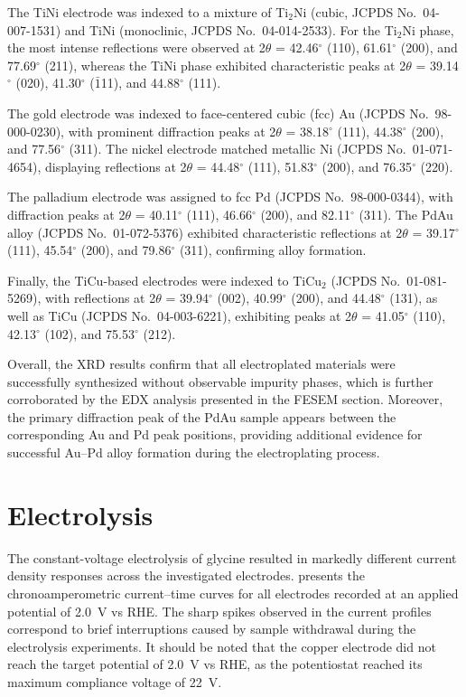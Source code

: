 \documentclass[journal=jacsat,manuscript=article,email=false]{achemso}
\begin{document}
The TiNi electrode was indexed to a mixture of Ti$_2$Ni (cubic, JCPDS No.~04-007-1531) and TiNi (monoclinic, JCPDS No.~04-014-2533). For the Ti$_2$Ni phase, the most intense reflections were observed at 2$\theta$ = 42.46$^\circ$ (110), 61.61$^\circ$ (200), and 77.69$^\circ$ (211), whereas the TiNi phase exhibited characteristic peaks at 2$\theta$ = 39.14$^\circ$ (020), 41.30$^\circ$ ($\bar{1}$11), and 44.88$^\circ$ (111).

The gold electrode was indexed to face-centered cubic (fcc) Au (JCPDS No.~98-000-0230), with prominent diffraction peaks at 2$\theta$ = 38.18$^\circ$ (111), 44.38$^\circ$ (200), and 77.56$^\circ$ (311). The nickel electrode matched metallic Ni (JCPDS No.~01-071-4654), displaying reflections at 2$\theta$ = 44.48$^\circ$ (111), 51.83$^\circ$ (200), and 76.35$^\circ$ (220).

The palladium electrode was assigned to fcc Pd (JCPDS No.~98-000-0344), with diffraction peaks at 2$\theta$ = 40.11$^\circ$ (111), 46.66$^\circ$ (200), and 82.11$^\circ$ (311). The PdAu alloy (JCPDS No.~01-072-5376) exhibited characteristic reflections at 2$\theta$ = 39.17$^\circ$ (111), 45.54$^\circ$ (200), and 79.86$^\circ$ (311), confirming alloy formation.

Finally, the TiCu-based electrodes were indexed to TiCu$_2$ (JCPDS No.~01-081-5269), with reflections at 2$\theta$ = 39.94$^\circ$ (002), 40.99$^\circ$ (200), and 44.48$^\circ$ (131), as well as TiCu (JCPDS No.~04-003-6221), exhibiting peaks at 2$\theta$ = 41.05$^\circ$ (110), 42.13$^\circ$ (102), and 75.53$^\circ$ (212).

Overall, the XRD results confirm that all electroplated materials were successfully synthesized without observable impurity phases, which is further corroborated by the EDX analysis presented in the FESEM section. Moreover, the primary diffraction peak of the PdAu sample appears between the corresponding Au and Pd peak positions, providing additional evidence for successful Au--Pd alloy formation during the electroplating process.


\FloatBarrier
\newpage
\section{Electrolysis}

The constant-voltage electrolysis of glycine resulted in markedly different current density responses across the investigated electrodes.  presents the chronoamperometric current--time curves for all electrodes recorded at an applied potential of 2.0~V vs RHE. The sharp spikes observed in the current profiles correspond to brief interruptions caused by sample withdrawal during the electrolysis experiments. It should be noted that the copper electrode did not reach the target potential of 2.0~V vs RHE, as the potentiostat reached its maximum compliance voltage of 22~V.
\end{document}
